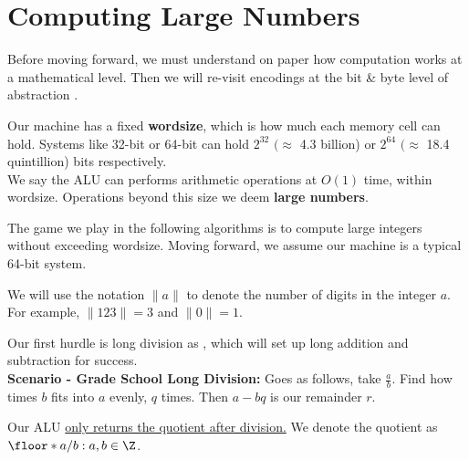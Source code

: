 \section{Computing Large Numbers}
\noindent
Before moving forward, we must understand on paper how computation works at a mathematical level. Then 
we will re-visit encodings at the bit \& byte level of abstraction \cite{shoup2008computational_introduction_ntb_v2}.

\begin{Def}[Wordsize]

    Our machine has a fixed \textbf{wordsize}, which is how much each memory cell can hold. Systems like 32-bit or 64-bit can hold $2^{32}$ $(\approx$ 4.3 billion) or $2^{64}$ $(\approx$ 18.4 quintillion) bits respectively.\\

    \noindent
    We say the ALU can performs arithmetic operations at $O(1)$ time, within wordsize. Operations beyond this size we deem \textbf{large numbers}.
\end{Def}
\noindent
The game we play in the following algorithms is to compute large integers without exceeding wordsize. Moving forward, we assume our machine is a typical 64-bit system.
\begin{Func}

    \vspace{-.5em}
    We will use the notation $\|a\|$ to denote the number of digits in the integer $a$. For example, $\|123\| = 3$ and $\|0\| = 1$.
\end{Func}

\noindent
Our first hurdle is long division as , which will set up long addition and subtraction for success.\\

\noindent
\textbf{Scenario - Grade School Long Division:} Goes as follows, take $\frac{a}{b}$. Find how times $b$ fits into $a$ evenly, $q$ times. Then $a-bq$ is our remainder $r$.
\begin{Def}

    Our ALU  \underline{only returns the quotient after division.} We denote the quotient as $\floor*{a/b}:a,b\in\Z$.
\end{Def}

